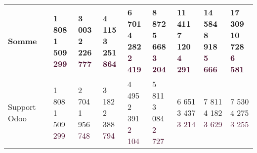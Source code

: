 \begin{table}
\begin{tabular}{|l|l|l|l|l|l|l|l|l|}
Somme &
\shortstack[r]{1 808 \\ \textcolor[HTML]{274e13}{1 509} \\ \textcolor[HTML]{4c1130}{299}} & 
\shortstack[r]{3 003 \\ \textcolor[HTML]{274e13}{2 226} \\ \textcolor[HTML]{4c1130}{777}} &
\shortstack[r]{4 115 \\ \textcolor[HTML]{274e13}{3 251} \\ \textcolor[HTML]{4c1130}{864}} &
\shortstack[r]{6 701 \\ \textcolor[HTML]{274e13}{4 282} \\ \textcolor[HTML]{4c1130}{2 419}} &
\shortstack[r]{8 872 \\ \textcolor[HTML]{274e13}{5 668} \\ \textcolor[HTML]{4c1130}{3 204}} &
\shortstack[r]{11 411 \\ \textcolor[HTML]{274e13}{7 120} \\ \textcolor[HTML]{4c1130}{4 291}} &
\shortstack[r]{14 584 \\ \textcolor[HTML]{274e13}{8 918} \\ \textcolor[HTML]{4c1130}{5 666}} &
\shortstack[r]{17 309 \\ \textcolor[HTML]{274e13}{10 728} \\ \textcolor[HTML]{4c1130}{6 581}} \\\hline

Support Odoo &
\shortstack[r]{1 808 \\ \textcolor[HTML]{274e13}{1 509} \\ \textcolor[HTML]{4c1130}{299}} & 
\shortstack[r]{2 704 \\ \textcolor[HTML]{274e13}{1 956} \\ \textcolor[HTML]{4c1130}{748}} &
\shortstack[r]{3 182 \\ \textcolor[HTML]{274e13}{2 388} \\ \textcolor[HTML]{4c1130}{794}} &
\shortstack[r]{4 495 \\ \textcolor[HTML]{274e13}{2 391} \\ \textcolor[HTML]{4c1130}{2 104}} &
\shortstack[r]{5 811 \\ \textcolor[HTML]{274e13}{3 084} \\ \textcolor[HTML]{4c1130}{2 727}} &
\shortstack[r]{6 651 \\ \textcolor[HTML]{274e13}{3 437} \\ \textcolor[HTML]{4c1130}{3 214}} &
\shortstack[r]{7 811 \\ \textcolor[HTML]{274e13}{4 182} \\ \textcolor[HTML]{4c1130}{3 629}} &
\shortstack[r]{7 530 \\ \textcolor[HTML]{274e13}{4 275} \\ \textcolor[HTML]{4c1130}{3 255}} \\\hline


\end{tabular}
\end{table}
